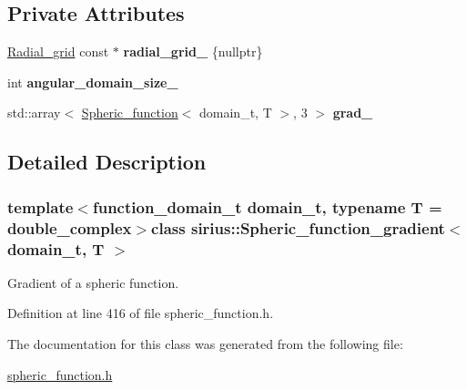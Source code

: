 \subsection*{Private Attributes}
\begin{DoxyCompactItemize}
\item 
\hypertarget{classsirius_1_1_spheric__function__gradient_a4ce3851bbb96bb591b662999c3637d02}{}\hyperlink{classsirius_1_1_radial__grid}{Radial\+\_\+grid} const $\ast$ {\bfseries radial\+\_\+grid\+\_\+} \{nullptr\}\label{classsirius_1_1_spheric__function__gradient_a4ce3851bbb96bb591b662999c3637d02}

\item 
\hypertarget{classsirius_1_1_spheric__function__gradient_a6f59cfc4a7d9c9f3eef407666cda79b3}{}int {\bfseries angular\+\_\+domain\+\_\+size\+\_\+}\label{classsirius_1_1_spheric__function__gradient_a6f59cfc4a7d9c9f3eef407666cda79b3}

\item 
\hypertarget{classsirius_1_1_spheric__function__gradient_a8990cba84584ef7e8ad4edae5c0748ca}{}std\+::array$<$ \hyperlink{classsirius_1_1_spheric__function}{Spheric\+\_\+function}$<$ domain\+\_\+t, T $>$, 3 $>$ {\bfseries grad\+\_\+}\label{classsirius_1_1_spheric__function__gradient_a8990cba84584ef7e8ad4edae5c0748ca}

\end{DoxyCompactItemize}


\subsection{Detailed Description}
\subsubsection*{template$<$function\+\_\+domain\+\_\+t domain\+\_\+t, typename T = double\+\_\+complex$>$class sirius\+::\+Spheric\+\_\+function\+\_\+gradient$<$ domain\+\_\+t, T $>$}

Gradient of a spheric function. 

Definition at line 416 of file spheric\+\_\+function.\+h.



The documentation for this class was generated from the following file\+:\begin{DoxyCompactItemize}
\item 
\hyperlink{spheric__function_8h}{spheric\+\_\+function.\+h}\end{DoxyCompactItemize}
